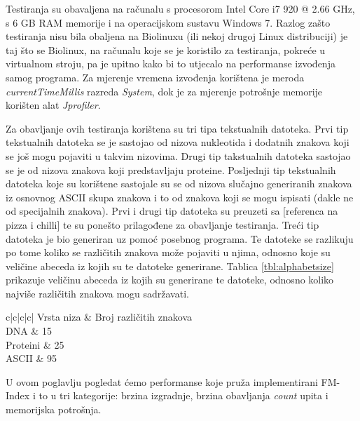 Testiranja su obavaljena na računalu s procesorom Intel Core i7 920 @ 2.66 GHz, s 6 GB RAM memorije i na operacijskom sustavu Windows 7. Razlog zašto testiranja nisu bila obaljena na Biolinuxu (ili nekoj drugoj Linux distribuciji) je taj što se Biolinux, na računalu koje se je koristilo za testiranja, pokreće u virtualnom stroju, pa je upitno kako bi to utjecalo na performanse izvođenja samog programa. Za mjerenje vremena izvođenja korištena je meroda \textit{currentTimeMillis} razreda \textit{System}, dok je za mjerenje potrošnje memorije korišten alat \textit{Jprofiler}.

Za obavljanje ovih testiranja korištena su tri tipa tekstualnih datoteka. Prvi tip tekstualnih datoteka se je sastojao od nizova nukleotida i dodatnih znakova koji se još mogu pojaviti u takvim nizovima. Drugi tip takstualnih datoteka sastojao se je od nizova znakova koji predstavljaju proteine. Posljednji tip tekstualnih datoteka koje su korištene sastojale su se od nizova slučajno generiranih znakova iz osnovnog ASCII skupa znakova i to od znakova koji se mogu ispisati (dakle ne od specijalnih znakova). Prvi i drugi tip datoteka su preuzeti sa [referenca na pizza i chilli] te su ponešto prilagođene za obavljanje testiranja. Treći tip datoteka je bio generiran uz pomoć posebnog programa. Te datoteke se razlikuju po tome koliko se različitih znakova može pojaviti u njima, odnosno koje su veličine abeceda iz kojih su te datoteke generirane. Tablica \ref{tbl:alphabetsize} prikazuje veličinu abeceda iz kojih su generirane te datoteke, odnosno koliko najviše različitih znakova mogu sadržavati. 

\begin{table}[h]
\caption{Maksimalna veličina abecede pojedinih datoteka}
\label{tbl:alphabetsize}
\centering\begin{tabular}{c|c|c|c|}
 \hline
{} {Vrsta niza} & Broj različitih znakova   \\ \hline
{} {   DNA   }		&	15		\\ \hline
{} {   Proteini   }	&	25		\\ \hline
{} {   ASCII   }	&	95		\\ \hline
\end{tabular}
\end{table}


U ovom poglavlju pogledat ćemo performanse koje pruža implementirani FM-Index i to u tri kategorije: brzina izgradnje, brzina obavljanja \textit{count} upita i memorijska potrošnja.

